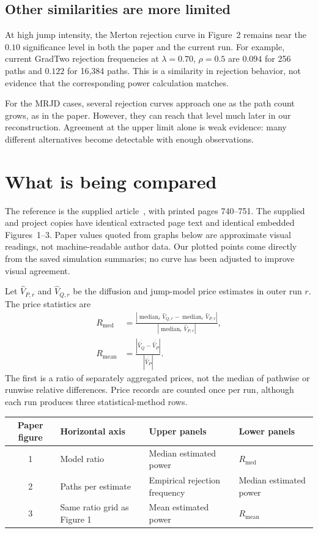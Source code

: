 \documentclass[11pt,a4paper]{article}
\newcommand{\med}{\operatorname{median}}
\begin{document}
\subsection{Other similarities are more limited}
At high jump intensity, the Merton rejection curve in Figure~2 remains
near the $0.10$ significance level in both the paper and the current
run. For example, current GradTwo rejection frequencies at
$\lambda=0.70$, $\rho=0.5$ are $0.094$ for 256 paths and $0.122$ for
16,384 paths. This is a similarity in rejection behavior, not evidence
that the corresponding power calculation matches.

For the MRJD cases, several rejection curves approach one as the path
count grows, as in the paper. However, they can reach that level much
later in our reconstruction. Agreement at the upper limit alone is
weak evidence: many different alternatives become detectable with
enough observations.

\section{What is being compared}
The reference is the supplied article~\cite{paper}, with printed pages
740--751. The supplied and project copies have identical extracted
page text and identical embedded Figures~1--3. Paper values quoted
from graphs below are approximate visual readings, not machine-readable
author data. Our plotted points come directly from the saved simulation
summaries; no curve has been adjusted to improve visual agreement.

Let $\widehat V_{P,r}$ and $\widehat V_{Q,r}$ be the diffusion and jump-model
price estimates in outer run $r$. The price statistics are
\begin{align}
R_{\mathrm{med}}&=
\frac{|\med_r\widehat V_{Q,r}-\med_r\widehat V_{P,r}|}
{|\med_r\widehat V_{P,r}|},\\
R_{\mathrm{mean}}&=
\frac{|\overline{\widehat V_Q}-\overline{\widehat V_P}|}
{|\overline{\widehat V_P}|}.
\end{align}
The first is a ratio of separately aggregated prices, not the median
of pathwise or runwise relative differences. Price records are counted
once per run, although each run produces three statistical-method rows.

\begin{center}\small
\begin{tabularx}{\linewidth}{@{}cXXX@{}}
\toprule
Paper figure & Horizontal axis & Upper panels & Lower panels\\
\midrule
1 & Model ratio & Median estimated power & $R_{\mathrm{med}}$\\
2 & Paths per estimate & Empirical rejection frequency & Median estimated power\\
3 & Same ratio grid as Figure 1 & Mean estimated power & $R_{\mathrm{mean}}$\\
\bottomrule
\end{tabularx}
\end{center}
\end{document}
